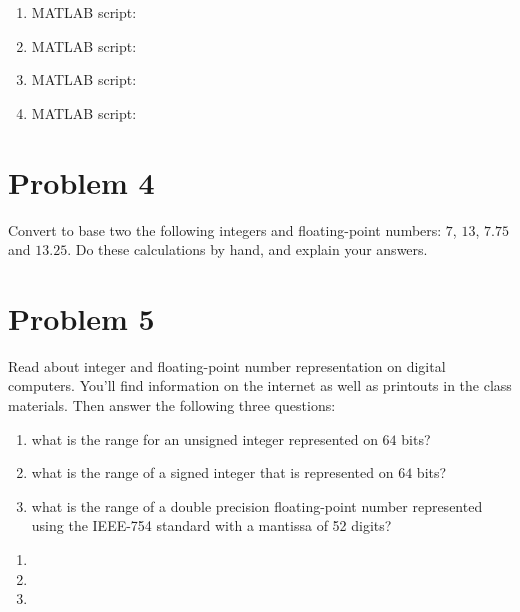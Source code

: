 \begin{solution}
  \quad
  \begin{enumerate}
    \item MATLAB script: 
    \item MATLAB script: 
    \item MATLAB script: 
    \item MATLAB script: 
    \newpage \quad \vfill
  \end{enumerate}
\end{solution}

\section{Problem 4}%
\label{sec:problem_4}
Convert to base two the following integers and floating-point numbers: $7$, $13$, $7.75$ and $13.25$. Do these calculations by hand, and explain your answers.
\begin{solution}
  \quad \vfill %
\end{solution}

\section{Problem 5}%
\label{sec:problem_5}
Read about integer and floating-point number representation on digital computers. You'll find information on the internet as well as printouts in the class materials. Then answer the following three questions:
\begin{enumerate}
  \item what is the range for an unsigned integer represented on $64$ bits?
  \item what is the range of a signed integer that is represented on $64$ bits?
  \item what is the range of a double precision floating-point number represented using the IEEE-754 standard with a mantissa of 52 digits?
\end{enumerate}
\begin{solution}
  \quad
  \begin{enumerate}
    \setlength\itemsep{12em}  %
    \item
    \item
    \item
      \quad \vfill            %
  \end{enumerate}
\end{solution}
